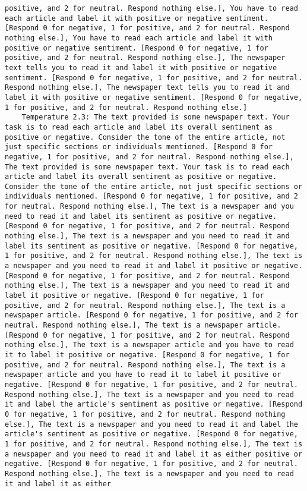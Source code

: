 \begin{lstlisting}[label=lst:poor_performing_prompts]
positive, and 2 for neutral. Respond nothing else.], You have to read each article and label it with positive or negative sentiment. [Respond 0 for negative, 1 for positive, and 2 for neutral. Respond nothing else.], You have to read each article and label it with positive or negative sentiment. [Respond 0 for negative, 1 for positive, and 2 for neutral. Respond nothing else.], The newspaper text tells you to read it and label it with positive or negative sentiment. [Respond 0 for negative, 1 for positive, and 2 for neutral. Respond nothing else.], The newspaper text tells you to read it and label it with positive or negative sentiment. [Respond 0 for negative, 1 for positive, and 2 for neutral. Respond nothing else.]
	Temperature 2.3: The text provided is some newspaper text. Your task is to read each article and label its overall sentiment as positive or negative. Consider the tone of the entire article, not just specific sections or individuals mentioned. [Respond 0 for negative, 1 for positive, and 2 for neutral. Respond nothing else.], The text provided is some newspaper text. Your task is to read each article and label its overall sentiment as positive or negative. Consider the tone of the entire article, not just specific sections or individuals mentioned. [Respond 0 for negative, 1 for positive, and 2 for neutral. Respond nothing else.], The text is a newspaper and you need to read it and label its sentiment as positive or negative. [Respond 0 for negative, 1 for positive, and 2 for neutral. Respond nothing else.], The text is a newspaper and you need to read it and label its sentiment as positive or negative. [Respond 0 for negative, 1 for positive, and 2 for neutral. Respond nothing else.], The text is a newspaper and you need to read it and label it positive or negative. [Respond 0 for negative, 1 for positive, and 2 for neutral. Respond nothing else.], The text is a newspaper and you need to read it and label it positive or negative. [Respond 0 for negative, 1 for positive, and 2 for neutral. Respond nothing else.], The text is a newspaper article. [Respond 0 for negative, 1 for positive, and 2 for neutral. Respond nothing else.], The text is a newspaper article. [Respond 0 for negative, 1 for positive, and 2 for neutral. Respond nothing else.], The text is a newspaper article and you have to read it to label it positive or negative. [Respond 0 for negative, 1 for positive, and 2 for neutral. Respond nothing else.], The text is a newspaper article and you have to read it to label it positive or negative. [Respond 0 for negative, 1 for positive, and 2 for neutral. Respond nothing else.], The text is a newspaper and you need to read it and label the article's sentiment as positive or negative. [Respond 0 for negative, 1 for positive, and 2 for neutral. Respond nothing else.], The text is a newspaper and you need to read it and label the article's sentiment as positive or negative. [Respond 0 for negative, 1 for positive, and 2 for neutral. Respond nothing else.], The text is a newspaper and you need to read it and label it as either positive or negative. [Respond 0 for negative, 1 for positive, and 2 for neutral. Respond nothing else.], The text is a newspaper and you need to read it and label it as either 
\end{lstlisting}
